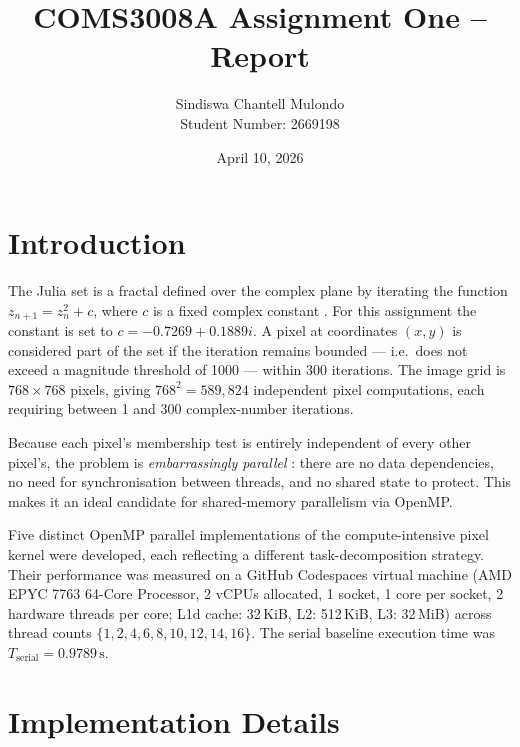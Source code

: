 
\title{COMS3008A Assignment One -- Report}
\author{Sindiswa Chantell Mulondo \\ Student Number: 2669198}
\date{April 10, 2026}
\maketitle
\pagestyle{fancy}
\fancyhf{}
\fancyhead[R]{\thepage}

\section{Introduction}

The Julia set is a fractal defined over the complex plane by iterating the function
$z_{n+1} = z_n^2 + c$, where $c$ is a fixed complex constant \citep{julia1918memoire}.
For this assignment the constant is set to $c = -0.7269 + 0.1889i$.
A pixel at coordinates $(x, y)$ is considered part of the set if the iteration remains
bounded — i.e.\ does not exceed a magnitude threshold of 1000 — within 300 iterations.
The image grid is $768 \times 768$ pixels, giving $768^2 = 589{,}824$ independent pixel
computations, each requiring between 1 and 300 complex-number iterations.

Because each pixel's membership test is entirely independent of every other pixel's, the
problem is \emph{embarrassingly parallel} \citep{grama2003introduction}: there are no
data dependencies, no need for synchronisation between threads, and no shared state to
protect.
This makes it an ideal candidate for shared-memory parallelism via OpenMP.

Five distinct OpenMP parallel implementations of the compute-intensive pixel kernel were
developed, each reflecting a different task-decomposition strategy.
Their performance was measured on a GitHub Codespaces virtual machine (AMD EPYC 7763
64-Core Processor, 2 vCPUs allocated, 1 socket, 1 core per socket, 2 hardware threads
per core; L1d cache: 32\,KiB, L2: 512\,KiB, L3: 32\,MiB) across thread counts
$\{1, 2, 4, 6, 8, 10, 12, 14, 16\}$.
The serial baseline execution time was $T_{\text{serial}} = 0.9789\,\text{s}$.

\section{Implementation Details}

